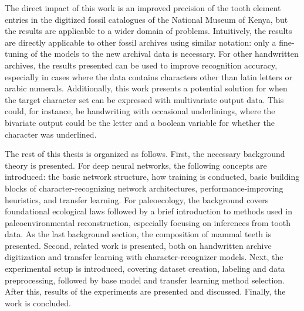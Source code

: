 \documentclass{article}
\begin{document}



The direct impact of this work is an improved precision of the tooth element entries in the digitized 
fossil catalogues of the National Museum of Kenya, but the results are applicable to a wider domain of problems.
Intuitively, the results are directly applicable to other fossil archives using similar notation: only a fine-tuning of the 
models to the new archival data is necessary.
For other handwritten archives, the results presented can be used to improve recognition accuracy, especially in cases 
where the data contains characters other than latin letters or arabic numerals. Additionally, this work presents
a potential solution for when the target character set can be expressed with multivariate output data. This could, for 
instance, be handwriting with occasional underlinings, where the bivariate output could be the letter and a boolean variable for 
whether the character was underlined.

The rest of this thesis is organized as follows. First, the necessary background theory is 
presented. For deep neural networks, the following concepts are introduced:
the basic network structure, how training is conducted, basic building blocks of character-recognizing network architectures, performance-improving 
heuristics, and transfer learning. For paleoecology, the background covers 
foundational ecological laws followed by a brief introduction to methods used in
paleoenvironmental reconstruction, especially focusing on inferences from tooth data.
As the last background section, the composition of mammal teeth is presented. 
Second, related work is presented, both on
handwritten archive digitization and transfer learning with character-recognizer models.
Next, the experimental setup is introduced, covering dataset creation, labeling and data 
preprocessing, followed by base model and transfer learning method selection. After this, 
results of the experiments are presented and discussed. Finally, the work is concluded.
\end{document}
